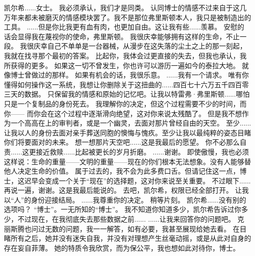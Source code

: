\documentclass[openany]{book}
\begin{document}
\begin{dialogue}
     凯尔希......女士。
     我必须承认，我们才是同类。
     认同博士的情感不过来自于这几万年来都未被磨灭的情感模块罢了。我不是那位弗里斯顿本人，我只是被制造出的工具。
     ......但是你比我更有血有肉，也更加自由。这让我有些......羡慕。
     安慰的话会显得我在蔑视你的使命，弗里斯顿。
     我很庆幸能够拥有这样的生命，不止一段。
     我很庆幸自己不单单是一台器械，从漫步在这失落的尘土之上的那一刻起，我就在找寻那个最初的答案。
     比起你，我体会过更直接的失去，但我也承认，我所获得的更多。
     如果这一切不曾发生，你也许可以游历一遍如今的泰拉大地。
     就像博士曾做过的那样。
     如果有机会的话，我很乐意。
     ......我有一个请求。
     唯有你懂得如何操作这一系统，我想让你删除关于这扭曲的......四百七十六万五千四百零三天的数据。
     只保留我的情感和原始的记忆吧。让我以特雷弗·弗里斯顿......哪怕只是一个复制品的身份死去。
     我理解你的决定，但这个过程需要不少的时间，而你——
     而你会在这个过程中逐渐滑向绝望，这对你来说太残酷了。
     但是我不想作为一个高高在上的审判者，或是一个幽灵，去面对那片曾经自由的天空。
     至少......让我以人的身份去面对亲手葬送同胞的懊悔与愧疚。至少让我以最纯粹的姿态目睹你们将要面对的未来。
     想一想那片天空吧......这是我最后的愿望。
     你不必那么自责......这更接近救赎......比起被更长的岁月折磨。
     ......谢谢。
     即使傲慢，我也必须这样说：生命的重量——文明的重量——现在的你们根本无法想象。没有人能够替他人决定生命的价值。
     属于过去的，我不会为此多费口舌。但请记住这一点，博士，这迟早会变成一个关于“现在”的选择题，这对你来说至关重要。
     不过眼下......再说一遍，谢谢。这是我最后能说的。
     去吧，凯尔希，权限已经全部打开。
     让我以“人”的身份迎接结局。
     ......我尊重你的决定。
     稍等片刻。
     凯尔希......没有别的选项吗？
     “博士”。一无所知的“博士”。
     我不知道你知道多少，凯尔希告诉过你多少，不过现在，在我彻底失去那些数据之前......
     ......让我来回答你的问题吧。
     克丽斯腾也问过无数的问题，我一一解答，如有必要，我甚至展现给她去看。
     在目睹所有之后，她并没有迷失自我，并没有对理想产生丝毫动摇，或是从此对自身的存在妄自菲薄。
     她的特质令我欣赏，而为保公平，我也想如此对待你，博士。

\end{dialogue}
\end{document}
